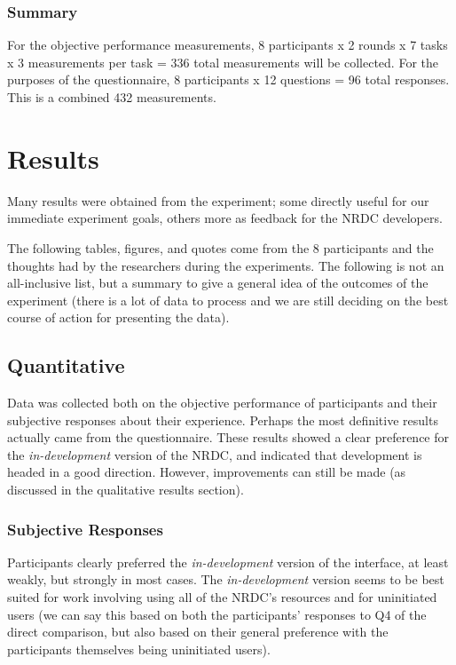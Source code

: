 \documentclass{article}
\begin{document}
\subsubsection{Summary}
For the objective performance measurements, 8 participants x 2 rounds x 7 tasks x 3 measurements per task = 336 total measurements will be collected. For the purposes of the questionnaire, 8 participants x 12 questions = 96 total responses. This is a combined 432 measurements.

%
%
\section{Results}

Many results were obtained from the experiment; some directly useful for our immediate experiment goals, others more as feedback for the NRDC developers. 

The following tables, figures, and quotes come from the 8 participants and the thoughts had by the researchers during the experiments. The following is not an all-inclusive list, but a summary to give a general idea of the outcomes of the experiment (there is a lot of data to process and we are still deciding on the best course of action for presenting the data).

%
\subsection{Quantitative}

Data was collected both on the objective performance of participants and their subjective responses about their experience. Perhaps the most definitive results actually came from the questionnaire. These results showed a clear preference for the \emph{in-development} version of the NRDC, and indicated that development is headed in a good direction. However, improvements can still be made (as discussed in the qualitative results section).

\subsubsection{Subjective Responses}
Participants clearly preferred the \emph{in-development} version of the interface, at least weakly, but strongly in most cases. The \emph{in-development} version seems to be best suited for work involving using all of the NRDC's resources and for uninitiated users (we can say this based on both the participants' responses to Q4 of the direct comparison, but also based on their general preference with the participants themselves being uninitiated users).
\end{document}
